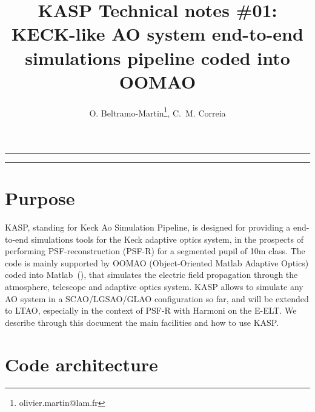 \documentclass[12pt]{article}
\title{KASP Technical notes \#01:\\ KECK-like AO system end-to-end simulations
	pipeline coded into OOMAO}
\author{O. Beltramo-Martin\footnote{olivier.martin@lam.fr}, C.~M. Correia}
\begin{document}
\maketitle

\rule{\columnwidth}{0.1mm}
\tableofcontents
\rule{\columnwidth}{0.1mm}
\section{Purpose}

KASP, standing for Keck Ao Simulation Pipeline, is designed for providing a end-to-end simulations tools for the Keck adaptive optics system, in the prospects of performing PSF-reconstruction (PSF-R) for a segmented pupil of 10m class. The code is mainly supported by OOMAO (Object-Oriented Matlab Adaptive Optics) coded into Matlab~(\cite{Conan2014OOMAO}), that simulates the electric field propagation through the atmosphere, telescope and adaptive optics system. KASP allows to simulate any AO system in a SCAO/LGSAO/GLAO configuration so far, and will be extended to LTAO, especially in the context of PSF-R with Harmoni on the E-ELT. We describe through this document the main facilities and how to use KASP.

\section{Code architecture}
\end{document}
